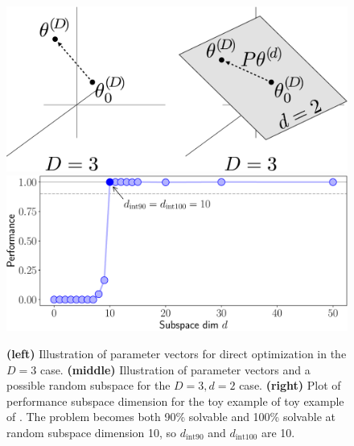 \documentclass{article} %
\begin{document}


\begin{figure}
\begin{center}

\includegraphics[width=.44\linewidth]{subspace_drawing_crop.pdf}
\hspace{.04\linewidth}
\includegraphics[width=.50\linewidth]{toy_example_crop.pdf}

\caption{
  \textbf{(left)} Illustration of parameter vectors for direct optimization in the $D=3$ case.
  \textbf{(middle)} Illustration of parameter vectors and a possible random subspace for the $D=3, d=2$ case.
  \textbf{(right)} Plot of performance \vs subspace dimension for the toy example of toy example of . The problem becomes both 90\% solvable and 100\% solvable at random subspace dimension 10, so $d_{\mathrm{int90}}$ and $d_{\mathrm{int100}}$ are 10.
}
\end{center}
\end{figure}
\end{document}
